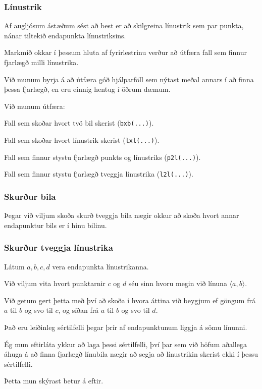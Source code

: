 \fi

{
	\frametitle{Línustrik}
	{
		\item<1-> Af augljósum ástæðum sést að best er að skilgreina línustrik sem par punkta, nánar tiltekið endapunkta línustriksins.
		\item<2-> Markmið okkar í þessum hluta af fyrirlestrinu verður að útfæra fall sem finnur fjarlægð milli línustrika.
		\item<3-> Við munum byrja á að útfæra góð hjálparföll sem nýtast meðal annars í að finna þessa fjarlægð, en eru einnig
			hentug í öðrum dæmum.
	}
}

{
	{
		\item<1-> Við munum útfæra:
		{
			\item<2-> Fall sem skoðar hvort tvö bil skerist (\texttt{bxb(...)}).
			\item<3-> Fall sem skoðar hvort línustrik skerist (\texttt{lxl(...)}).
			\item<4-> Fall sem finnur stystu fjarlægð punkts og línustriks (\texttt{p2l(...)}).
			\item<5-> Fall sem finnur stystu fjarlægð tveggja línustrika (\texttt{l2l(...)}).
		}
	}
}

{
	\frametitle{Skurður bila}
	{
		\item<1-> Þegar við viljum skoða skurð tveggja bila nægir okkur að skoða hvort annar endapunktur bils er í hinu bilinu.
		\item<2->[] 
	}
}

{
	\frametitle{Skurður tveggja línustrika}
	{
		\item<1-> Látum $a, b, c, d$ vera endapunkta línustrikanna.
		\item<2-> Við viljum vita hvort punktarnir $c$ og $d$ séu sinn hvoru megin við línuna $\langle a, b \rangle$.
		\item<3-> Við getum gert þetta með því að skoða í hvora áttina við beygjum ef göngum frá $a$ til $b$ og svo til $c$,
					og síðan frá $a$ til $b$ og svo til $d$.
	}
}

{
	{
		\item<1-> Það eru leiðinleg sértilfelli þegar þrír af endapunktunum liggja á sömu línunni.
		\item<2-> Ég mun eftirláta ykkur að laga þessi sértilfelli, því þar sem við höfum aðallega
			áhuga á að finna fjarlægð línubila nægir að segja að línustrikin skerist ekki í þessu sértilfelli.
		\item<3-> Þetta mun skýrast betur á eftir.
	}
}

